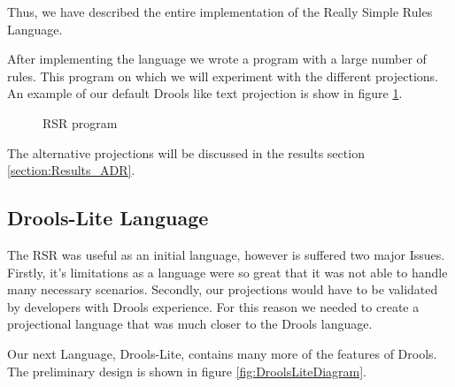 Thus, we have described the entire implementation of the Really Simple Rules Language.

After implementing the language we wrote a program with a large number of rules.
This program on which we will experiment with the different projections.
An example of our default Drools like text projection is show in figure \ref{fig:RSRProgram}.

\begin{figure}[h]
    \centering
    \caption{RSR program}
    \label{fig:RSRProgram}
\end{figure}

The alternative projections will be discussed in the results section \ref{section:Results_ADR}.

\subsection{Drools-Lite Language}

The RSR was useful as an initial language, however is suffered two major Issues.
Firstly, it's limitations as a language were so great that it was not able to handle many necessary scenarios.
Secondly, our projections would have to be validated by developers with Drools experience.
For this reason we needed to create a projectional language that was much closer to the Drools language.

Our next Language, Drools-Lite, contains many more of the features of Drools.
The preliminary design is shown in figure \ref{fig:DroolsLiteDiagram}.


